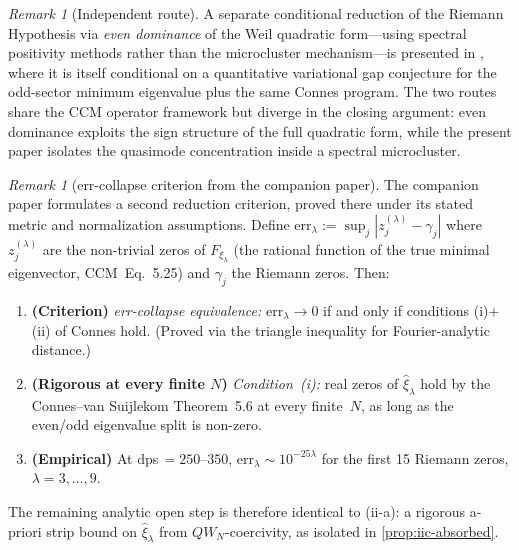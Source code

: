 \documentclass[12pt,a4paper]{article}
\theoremstyle{definition}
\theoremstyle{remark}
\newtheorem{remark}[theorem]{Remark}
\begin{document}
\begin{remark}[Independent route]
A separate conditional reduction of the Riemann Hypothesis via
\emph{even dominance} of the Weil quadratic form---using spectral
positivity methods rather than the microcluster mechanism---is
presented in \cite{Geiger2026evendom}, where it is itself conditional
on a quantitative variational gap conjecture for the odd-sector minimum
eigenvalue plus the same Connes program.  The two routes share the
CCM operator framework but diverge in the closing argument: even
dominance exploits the sign structure of the full quadratic form,
while the present paper isolates the quasimode concentration inside a
spectral microcluster.
\end{remark}

\begin{remark}[err-collapse criterion from the companion paper]
\label{rem:err-collapse}
The companion paper \cite{Geiger2026evendom} formulates a second
reduction criterion, proved there under its stated metric and
normalization assumptions.  Define
$\mathrm{err}_\lambda := \sup_j |z_j^{(\lambda)} - \gamma_j|$ where
$z_j^{(\lambda)}$ are the non-trivial zeros of $F_{\xi_\lambda}$ (the
rational function of the true minimal eigenvector, CCM~Eq.~5.25) and
$\gamma_j$ the Riemann zeros.  Then:
\begin{enumerate}[label=(\alph*)]
  \item \textbf{(Criterion)} \emph{err-collapse equivalence:}
    $\mathrm{err}_\lambda \to 0$ if and only if conditions (i)$+$(ii)
    of Connes \cite[§6.6]{Connes2026} hold.  (Proved via the triangle
    inequality for Fourier-analytic distance.)
  \item \textbf{(Rigorous at every finite $N$)} \emph{Condition~(i):}
    real zeros of $\hat{\xi}_\lambda$ hold by the Connes--van Suijlekom
    Theorem~5.6 \cite{ConnesvS2025} at every finite~$N$, as long as the
    even/odd eigenvalue split is non-zero.
  \item \textbf{(Empirical)} At dps$\,= 250$--$350$, $\mathrm{err}_\lambda
    \sim 10^{-25\lambda}$ for the first 15 Riemann zeros, $\lambda=3,\ldots,9$.
\end{enumerate}
The remaining analytic open step is therefore identical to (ii-a): a
rigorous a-priori strip bound on $\hat{\xi}_\lambda$ from $QW_N$-coercivity,
as isolated in \cref{prop:iic-absorbed}.
\end{remark}

\end{document}
